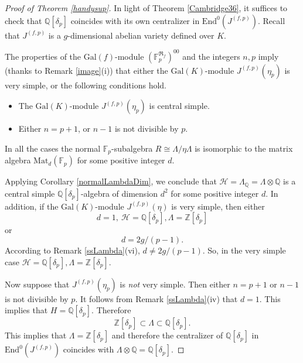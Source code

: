 \documentclass[12pt,a4paper,reqno]{amsart}
\def\Q{{\mathbb Q}}
\def\Z{{\mathbb Z}}
\def\R{{\mathbb R}}
\def\F{{\mathbb F}}
\def\R{{\mathfrak R}}
\def\Gal{\mathrm{Gal}}
\def\End{\mathrm{End}}
\def\Mat{\mathrm{Mat}}
\theoremstyle{definition}
\begin{document}
\begin{proof}[Proof of Theorem \ref{handysup}]
In light of Theorem \ref{Cambridge36},
it suffices to check that $\Q[\delta_p]$ coincides with its own centralizer in
$\End^0(J^{(f,p)})$.
Recall that $J^{(f,p)}$ is a $g$-dimensional
abelian variety defined over $K$.


The properties of the $\Gal(f)$-module $(\F_p^{\R_f})^{00}$ and the integers $n,p$  imply (thanks to Remark \ref{image}(i)) that either
the $\Gal(K)$-module $J^{(f,p)}(\eta_p)$ is  very simple, or  the following conditions hold.
\begin{itemize}
\item[(a)]
The $\Gal(K)$-module $J^{(f,p)}(\eta_p)$ is central simple.
\item[(b)]
Either $n=p+1$, or $n-1$ is not divisible by $p$.
\end{itemize}
In all the cases the normal $\F_p$-subalgebra $R\cong \Lambda/\eta\Lambda$ is isomorphic
to the matrix algebra $\Mat_d(\F_p)$ for some positive integer $d$.

Applying Corollary \ref{normalLambdaDim},
we conclude that $\mathcal{H}=\Lambda_{\Q}=\Lambda\otimes\Q$ is a central simple $\Q[\delta_p]$-algebra of dimension $d^2$ for some positive integer $d$.
In addition, if  the $\Gal(K)$-module $J^{(f,p)}(\eta)$ is  very simple, then either 
$$d=1, \ \mathcal{H}=\Q[\delta_p], \Lambda=\Z[\delta_p]$$
or 
$$d=2g/(p-1).$$ 
According  to   Remark \ref{ssLambda}(vi), $ d \ne 2g/(p-1)$. So, in the very simple case
$\mathcal{H}=\Q[\delta_p], \Lambda=\Z[\delta_p]$.

Now suppose that $J^{(f,p)}(\eta_p)$ is  {\sl not} very simple. Then either $n=p+1$ or $n-1$ is not divisible by $p$. It follows from  Remark \ref{ssLambda}(iv) that $d=1$. This implies that 
$H=\Q[\delta_p]$.  Therefore 
$$\Z[\delta_p]\subset \Lambda \subset \Q[\delta_p].$$
This implies that $\Lambda=\Z[\delta_p]$ and therefore the centralizer of $\Q[\delta_p]$
 in $\End^0(J^{(f,p)})$ coincides with $\Lambda\otimes\Q=\Q[\delta_p]$.

\end{proof}
\end{document}
